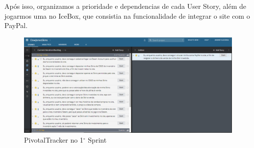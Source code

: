 \documentclass[a4paper,12pt]{article}
\begin{document}
    Após isso, organizamos a prioridade e dependencias de cada User Story, além de jogarmos uma no IceBox, que 
    consistia na funcionalidade de integrar o site com o PayPal. 
    \begin{figure}[!htb]
        \centering
        \includegraphics[scale=0.5]{Imagens/Pivotal1.png}
        \caption{PivotalTracker no 1$^{\circ}$ Sprint}
    \end{figure}
\end{document}
